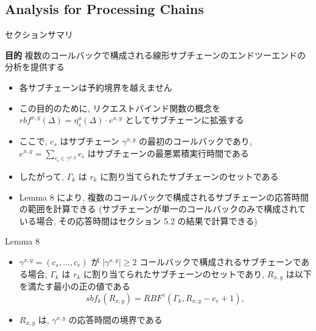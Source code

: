 \subsection{Analysis for Processing Chains}
\label{ssec: analysis for processing chains}

\begin{frame}{セクションサマリ}
    \begin{itembox}[l]{\textbf{目的}}
        複数のコールバックで構成される線形サブチェーンのエンドツーエンドの分析を提供する
    \end{itembox}
\end{frame}

\begin{frame}{}
    \begin{itemize}
        \item 各サブチェーンは予約境界を越えません
        \item この目的のために, リクエストバインド関数の概念を $r b f^{x, y}(\Delta)=\eta_{s}^{a}(\Delta) \cdot e^{x, y}$ としてサブチェーンに拡張する
        \item ここで, $c_{s}$ はサブチェーン $\gamma^{x, y}$ の最初のコールバックであり, $e^{x, y}=\sum_{c_{i} \in \gamma^{x, y}} e_{i}$ はサブチェーンの最悪累積実行時間である
        \item したがって, $\Gamma_{k}$ は $r_{k}$ に割り当てられたサブチェーンのセットである
        \item Lemma 8 により, 複数のコールバックで構成されるサブチェーンの応答時間の範囲を計算できる (サブチェーンが単一のコールバックのみで構成されている場合, その応答時間はセクション 5.2 の結果で計算できる)
    \end{itemize}
\end{frame}

\begin{frame}[label=lemma8]{Lemma 8}
    \begin{lemma}[]
        \begin{itemize}
            \item $\gamma^{x, y}=\left(c_{s}, \ldots, c_{e}\right)$ が $\left|\gamma^{x, y}\right| \geq 2$ コールバックで構成されるサブチェーンである場合, $\Gamma_{k}$ は $r_{k}$ に割り当てられたサブチェーンのセットであり, $R_{x, y}$ は以下を満たす最小の正の値である
                  \begin{equation*}
                      s b f_{k}\left(R_{x, y}\right)=R B F^{\gamma}\left(\Gamma_{k}, R_{x, y}-e_{e}+1\right),
                  \end{equation*}

            \item $R_{x, y}$ は, $\gamma^{x, y}$ の応答時間の境界である
        \end{itemize}
    \end{lemma}
\end{frame}

